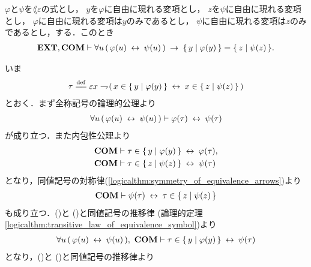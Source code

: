 	\begin{screen}
		\begin{thm}
		\label{thm:equivalent_formula_rewriting_6}
			$\varphi$と$\psi$を$\lang{\varepsilon}$の式とし，
			$y$を$\varphi$に自由に現れる変項とし，
			$z$を$\psi$に自由に現れる変項とし，
			$\varphi$に自由に現れる変項は$y$のみであるとし，
			$\psi$に自由に現れる変項は$z$のみであるとし，する．このとき
			\begin{align}
				\mbox{{\bf EXT}},\mbox{\bf COM} \vdash \forall u\, (\, \varphi(u) \hspace{0.25em}\leftrightarrow\hspace{0.25em} \psi(u)\, )
				\hspace{0.25em}\rightarrow\hspace{0.25em} \{\, y \mid \varphi(y)\, \} = \{\, z \mid \psi(z)\, \}.
			\end{align}
		\end{thm}
	\end{screen}
	
	\begin{sketch}
		いま
		\begin{align}
			\tau \defeq \varepsilon x \negation (\, x \in \Set{y}{\varphi(y)} \lrarrow x \in \Set{z}{\psi(z)}\, )
		\end{align}
		とおく．まず全称記号の論理的公理より
		\begin{align}
			\forall u\, (\, \varphi(u) \hspace{0.25em}\leftrightarrow\hspace{0.25em} \psi(u)\, )
			\vdash \varphi(\tau) \hspace{0.25em}\leftrightarrow\hspace{0.25em} \psi(\tau)
			\label{fom:equivalent_formula_rewriting_6_1}
		\end{align}
		が成り立つ．また内包性公理より
		\begin{align}
			\mbox{\bf COM} &\vdash \tau \in \{\, y \mid \varphi(y)\, \} \hspace{0.25em}\leftrightarrow\hspace{0.25em} \varphi(\tau), 
			\label{fom:equivalent_formula_rewriting_6_2} \\
			\mbox{\bf COM} &\vdash \tau \in \{\, z \mid \psi(z)\, \} \hspace{0.25em}\leftrightarrow\hspace{0.25em} \psi(\tau)
		\end{align}
		となり，同値記号の対称律(\ref{logicalthm:symmetry_of_equivalence_arrows})より
		\begin{align}
			\mbox{\bf COM} \vdash \psi(\tau) \hspace{0.25em}\leftrightarrow\hspace{0.25em} \tau \in \{\, z \mid \psi(z)\, \}
			\label{fom:equivalent_formula_rewriting_6_3}
		\end{align}
		も成り立つ．()と
		()と同値記号の推移律
		(論理的定理\ref{logicalthm:transitive_law_of_equivalence_symbol})より
		\begin{align}
			\forall u\, (\, \varphi(u) \hspace{0.25em}\leftrightarrow\hspace{0.25em} \psi(u)\, ),\ \mbox{\bf COM} \vdash
			\tau \in \{\, y \mid \varphi(y)\, \} \hspace{0.25em}\leftrightarrow\hspace{0.25em} \psi(\tau)
			\label{fom:equivalent_formula_rewriting_6_4}
		\end{align}
		となり，()と
		()と同値記号の推移律より

\end{sketch}

